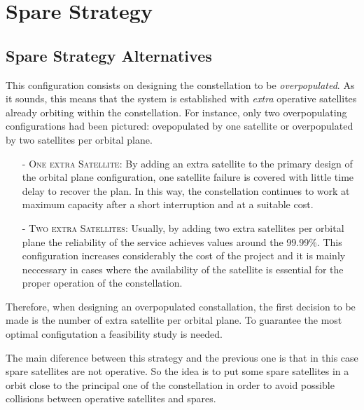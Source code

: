 \section{Spare Strategy}

\subsection{Spare Strategy Alternatives}

This configuration consists on designing the constellation to be \textit{ overpopulated}. As it sounds, this means that the system is established with \textit{extra} operative satellites already orbiting within the constellation. For instance, only two overpopulating configurations had been pictured: ovepopulated by one satellite or overpopulated by two satellites per orbital plane. 

\begin{itemize}
\item[-] \textsc{One extra Satellite:}
\newline
By adding an extra satellite to the primary design of the orbital plane configuration, one satellite failure is covered with little time delay to recover the plan. In this way, the constellation continues to work at maximum capacity after a short interruption and at a suitable cost. 
\item[-] \textsc{Two extra Satellites:}
\newline
Usually, by adding two extra satellites per orbital plane the reliability of the service achieves values around the 99.99\%. This configuration increases considerably the cost of the project and it is mainly neccessary in cases where the availability of the satellite is essential for the proper operation of the constellation.
\end{itemize}

Therefore, when designing an overpopulated constallation, the first decision to be made is the number of extra satellite per orbital plane. To guarantee the most optimal configutation a feasibility study is needed.  

The main diference between this strategy and the previous one is that in this case spare satellites are not operative. So the idea is to put some spare satellites in a orbit close to the principal one of the constellation in order to avoid possible collisions between operative satellites and spares. 

